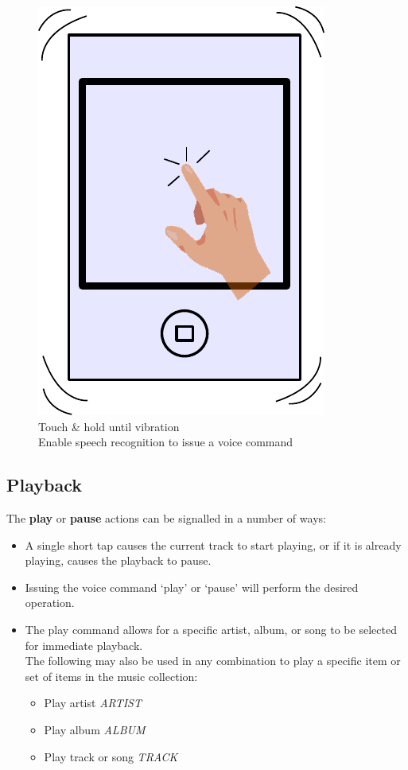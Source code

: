 \documentclass[12pt,letterpaper]{article}
\begin{document}
\begin{figure}[H]
	\centering
	\includegraphics[scale=0.6]{touch}
	\caption{Touch \& hold until vibration \\ Enable speech recognition to issue a voice command}
\end{figure}

\subsection*{Playback}

The \textbf{play} or \textbf{pause} actions can be signalled in a number of ways:

\begin{itemize}
\item A single short tap causes the current track to start playing, or if it is already playing, causes the playback to pause.
\item Issuing the voice command `play' or `pause' will perform the desired operation.
\item The play command allows for a specific artist, album, or song to be selected for immediate playback. \\ The following may also be used in any combination to play a specific item or set of items in the music collection:
	\begin{itemize}
	\item Play artist \textit{ARTIST}
	\item Play album \textit{ALBUM}
	\item Play track or song \textit{TRACK}
	\end{itemize}
\end{itemize}
\end{document}
